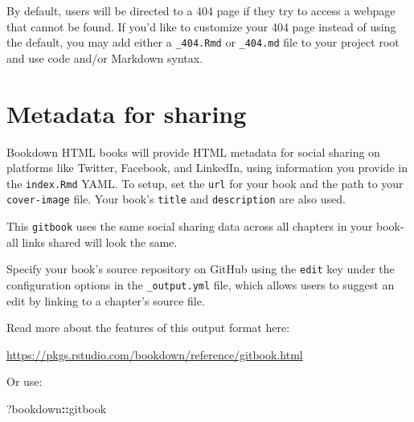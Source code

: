 \documentclass[
]{book}
\newenvironment{Shaded}{\begin{snugshade}}{\end{snugshade}}
\newcommand{\NormalTok}[1]{#1}
\newcommand{\SpecialCharTok}[1]{\textcolor[rgb]{0.81,0.36,0.00}{\textbf{#1}}}
\theoremstyle{definition}
\theoremstyle{definition}
\theoremstyle{definition}
\theoremstyle{definition}
\theoremstyle{remark}
\begin{document}
By default, users will be directed to a 404 page if they try to access a webpage that cannot be found. If you'd like to customize your 404 page instead of using the default, you may add either a \texttt{\_404.Rmd} or \texttt{\_404.md} file to your project root and use code and/or Markdown syntax.

\hypertarget{metadata-for-sharing}{%
\section{Metadata for sharing}\label{metadata-for-sharing}}

Bookdown HTML books will provide HTML metadata for social sharing on platforms like Twitter, Facebook, and LinkedIn, using information you provide in the \texttt{index.Rmd} YAML. To setup, set the \texttt{url} for your book and the path to your \texttt{cover-image} file. Your book's \texttt{title} and \texttt{description} are also used.

This \texttt{gitbook} uses the same social sharing data across all chapters in your book- all links shared will look the same.

Specify your book's source repository on GitHub using the \texttt{edit} key under the configuration options in the \texttt{\_output.yml} file, which allows users to suggest an edit by linking to a chapter's source file.

Read more about the features of this output format here:

\url{https://pkgs.rstudio.com/bookdown/reference/gitbook.html}

Or use:

\begin{Shaded}
\begin{Highlighting}[]
\NormalTok{?bookdown}\SpecialCharTok{::}\NormalTok{gitbook}
\end{Highlighting}
\end{Shaded}


  
\end{document}
